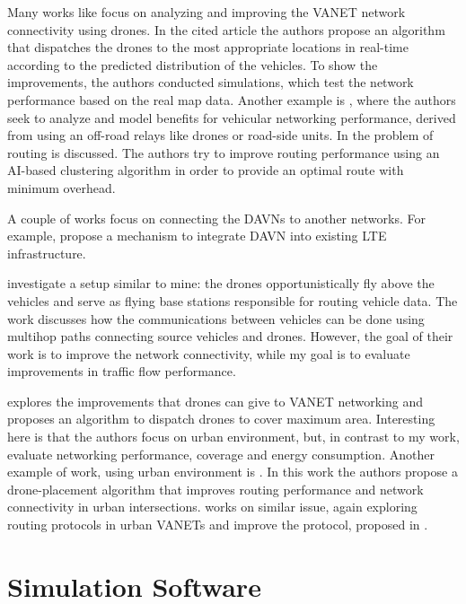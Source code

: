 \documentclass[]{nsm-thesis}
\begin{document}
Many works like \textcite{lin2020novel} focus on analyzing and improving the \ac{VANET} network connectivity using drones. In the cited article the authors propose an algorithm that dispatches the drones to the most appropriate locations in real-time according to the predicted distribution of the vehicles. To show the improvements, the authors conducted simulations, which test the network performance based on the real map data. Another example is \textcite{khabbaz2019modeling}, where the authors seek to analyze and model benefits for vehicular networking performance, derived from using an off-road relays like drones or road-side units. In \textcite{tariq2020imoc} the problem of routing is discussed. The authors try to improve routing performance using an AI-based clustering algorithm in order to provide an optimal route with minimum overhead.

A couple of works focus on connecting the \acp{DAVN} to another networks. For example, \textcite{saputro2018security} propose a mechanism to integrate \ac{DAVN} into existing LTE infrastructure.

\textcite{Khabbaz2021Multihop} investigate a setup similar to mine: the drones opportunistically fly above the vehicles and serve as flying base stations responsible for routing vehicle data. The work discusses how the communications between vehicles can be done using multihop paths connecting source vehicles and drones. However, the goal of their work is to improve the network connectivity, while my goal is to evaluate improvements in traffic flow performance.

\textcite{Oubbati2021Dispatch} explores the improvements that drones can give to \ac{VANET} networking and proposes an algorithm to dispatch drones to cover maximum area. Interesting here is that the authors focus on urban environment, but, in contrast to my work, evaluate networking performance, coverage and energy consumption. Another example of work, using urban environment is \textcite{Oubbati2016intersection}. In this work the authors propose a drone-placement algorithm that improves routing performance and network connectivity in urban intersections. \textcite{OUBBATI201793} works on similar issue, again exploring routing protocols in urban \acp{VANET} and improve the protocol, proposed in \cite{Oubbati2016intersection}.



\section {Simulation Software}
\end{document}
